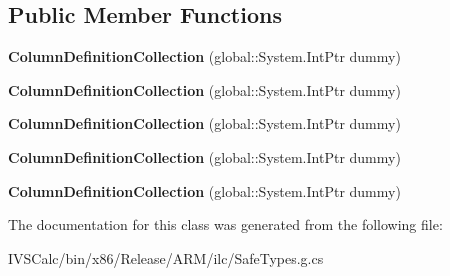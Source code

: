 \subsection*{Public Member Functions}
\begin{DoxyCompactItemize}
\item 
\mbox{\label{class_windows_1_1_u_i_1_1_xaml_1_1_controls_1_1_column_definition_collection_a4fa68c2789f522baa9971820752765b9}} 
{\bfseries Column\+Definition\+Collection} (global\+::\+System.\+Int\+Ptr dummy)
\item 
\mbox{\label{class_windows_1_1_u_i_1_1_xaml_1_1_controls_1_1_column_definition_collection_a4fa68c2789f522baa9971820752765b9}} 
{\bfseries Column\+Definition\+Collection} (global\+::\+System.\+Int\+Ptr dummy)
\item 
\mbox{\label{class_windows_1_1_u_i_1_1_xaml_1_1_controls_1_1_column_definition_collection_a4fa68c2789f522baa9971820752765b9}} 
{\bfseries Column\+Definition\+Collection} (global\+::\+System.\+Int\+Ptr dummy)
\item 
\mbox{\label{class_windows_1_1_u_i_1_1_xaml_1_1_controls_1_1_column_definition_collection_a4fa68c2789f522baa9971820752765b9}} 
{\bfseries Column\+Definition\+Collection} (global\+::\+System.\+Int\+Ptr dummy)
\item 
\mbox{\label{class_windows_1_1_u_i_1_1_xaml_1_1_controls_1_1_column_definition_collection_a4fa68c2789f522baa9971820752765b9}} 
{\bfseries Column\+Definition\+Collection} (global\+::\+System.\+Int\+Ptr dummy)
\end{DoxyCompactItemize}


The documentation for this class was generated from the following file\+:\begin{DoxyCompactItemize}
\item 
I\+V\+S\+Calc/bin/x86/\+Release/\+A\+R\+M/ilc/Safe\+Types.\+g.\+cs\end{DoxyCompactItemize}
